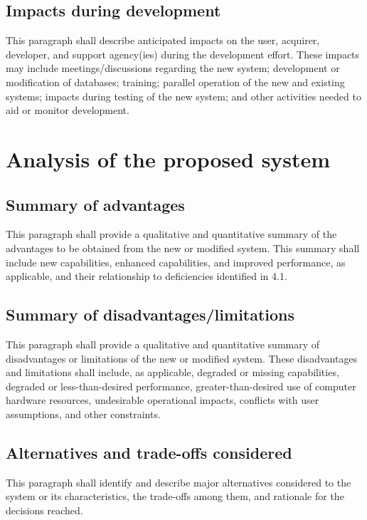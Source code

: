 \subsection{Impacts during development}

This paragraph shall describe anticipated impacts on the user, acquirer,
developer, and support agency(ies) during the development effort. These
impacts may include meetings/discussions regarding the new system;
development or modification of databases; training; parallel operation
of the new and existing systems; impacts during testing of the new
system; and other activities needed to aid or monitor development.

\section{Analysis of the proposed system}

\subsection{Summary of advantages}

This paragraph shall provide a qualitative and quantitative summary of
the advantages to be obtained from the new or modified system. This
summary shall include new capabilities, enhanced capabilities, and
improved performance, as applicable, and their relationship to
deficiencies identified in 4.1.

\subsection{Summary of disadvantages/limitations}

This paragraph shall provide a qualitative and quantitative summary of
disadvantages or limitations of the new or modified system. These
disadvantages and limitations shall include, as applicable, degraded or
missing capabilities, degraded or less-than-desired performance,
greater-than-desired use of computer hardware resources, undesirable
operational impacts, conflicts with user assumptions, and other
constraints.

\subsection{Alternatives and trade-offs considered}

This paragraph shall identify and describe major alternatives considered
to the system or its characteristics, the trade-offs among them, and
rationale for the decisions reached.

